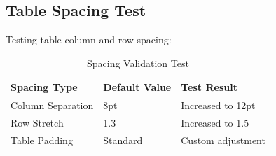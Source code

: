 \documentclass[11pt,a4paper]{article}
\begin{document}
\subsection{Table Spacing Test}
Testing table column and row spacing:

\setlength{\tabcolsep}{12pt}
\renewcommand{\arraystretch}{1.5}

\begin{table}[H]
\centering
\caption{Spacing Validation Test}
\begin{tabular}{|p{3cm}|p{4cm}|p{4cm}|}
\hline
\textbf{Spacing Type} & \textbf{Default Value} & \textbf{Test Result} \\
\hline
Column Separation & 8pt & Increased to 12pt \\
\hline
Row Stretch & 1.3 & Increased to 1.5 \\
\hline
Table Padding & Standard & Custom adjustment \\
\hline
\end{tabular}
\end{table}

\setlength{\tabcolsep}{8pt}
\renewcommand{\arraystretch}{1.3}
\end{document}
